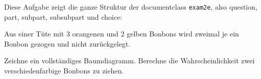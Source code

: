 \documentclass[a4paper,12pt]{article}
\begin{document}
\begin{question}
	Diese Aufgabe zeigt die ganze Struktur der documentclass \texttt{exam2e}, also question, part, subpart, subsubpart und choice:
\end{question}





\question[5]
	Aus einer Tüte mit 
	3 orangenen und 2 gelben Bonbons
	wird zweimal je ein Bonbon gezogen und nicht zurückgelegt.
\begin{subparts}
	\subpart Zeichne ein vollständiges Baumdiagramm.
%
	\subpart Berechne die Wahrscheinlichkeit zwei verschiedenfarbige Bonbons zu ziehen.
\end{subparts}
\end{document}
